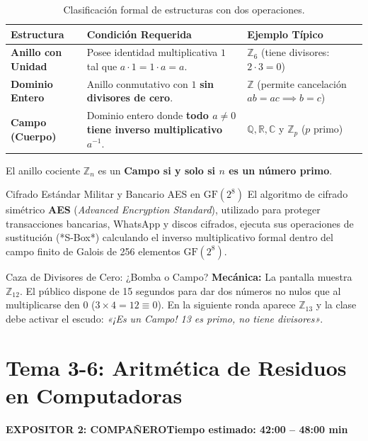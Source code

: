 \documentclass[11pt,a4paper]{article}
\newcommand{\badgeComp}{\colorbox{exp2bg}{\textcolor{exp2fg}{\bfseries\sffamily\footnotesize EXPOSITOR 2: COMPAÑERO}}}
\begin{document}
\begin{table}[h!]
\centering
\small
\renewcommand{\arraystretch}{1.2}
\begin{tabularx}{\textwidth}{l X l}
\toprule
\textbf{Estructura} & \textbf{Condición Requerida} & \textbf{Ejemplo Típico} \\
\midrule
\textbf{Anillo con Unidad} & Posee identidad multiplicativa $1$ tal que $a \cdot 1 = 1 \cdot a = a$. & $\mathbb{Z}_6$ (tiene divisores: $2 \cdot 3 = 0$) \\
\textbf{Dominio Entero} & Anillo conmutativo con $1$ \textbf{sin divisores de cero}. & $\mathbb{Z}$ (permite cancelación $ab=ac \implies b=c$) \\
\textbf{Campo (Cuerpo)} & Dominio entero donde \textbf{todo $a \neq 0$ tiene inverso multiplicativo $a^{-1}$}. & $\mathbb{Q}, \mathbb{R}, \mathbb{C}$ y $\mathbb{Z}_p$ ($p$ primo) \\
\bottomrule
\end{tabularx}
\caption{Clasificación formal de estructuras con dos operaciones.}
\end{table}

\begin{teorema}
El anillo cociente $\mathbb{Z}_n$ es un \textbf{Campo si y solo si $n$ es un número primo}.
\end{teorema}

\begin{aplicacion}{Cifrado Estándar Militar y Bancario AES en $\mathrm{GF}(2^8)$}
El algoritmo de cifrado simétrico \textbf{AES} (\textit{Advanced Encryption Standard}), utilizado para proteger transacciones bancarias, WhatsApp y discos cifrados, ejecuta sus operaciones de sustitución (*S-Box*) calculando el inverso multiplicativo formal dentro del campo finito de Galois de 256 elementos $\mathrm{GF}(2^8)$.
\end{aplicacion}

\begin{minijuego}{Caza de Divisores de Cero: ¿Bomba o Campo?}
\textbf{Mecánica:} La pantalla muestra $\mathbb{Z}_{12}$. El público dispone de 15 segundos para dar dos números no nulos que al multiplicarse den 0 ($3 \times 4 = 12 \equiv 0$). En la siguiente ronda aparece $\mathbb{Z}_{13}$ y la clase debe activar el escudo: \textit{«¡Es un Campo! 13 es primo, no tiene divisores»}.
\end{minijuego}

\newpage

\section{Tema 3-6: Aritmética de Residuos en Computadoras}
\noindent\badgeComp \hfill \textbf{Tiempo estimado: 42:00 -- 48:00 min}
\end{document}
